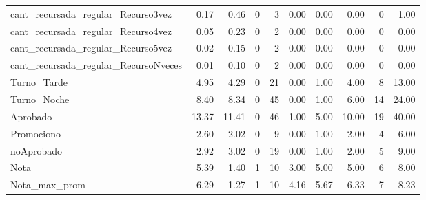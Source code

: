 \begin{table}[!h]
{\begin{tabular}[t]{lrrrrrrrrr}
			\rowcolor{gray!6}  cant\_recursada\_regular\_Recurso3vez & 0.17 & 0.46 & 0 & 3 & 0.00 & 0.00 & 0.00 & 0 & 1.00\\
			cant\_recursada\_regular\_Recurso4vez & 0.05 & 0.23 & 0 & 2 & 0.00 & 0.00 & 0.00 & 0 & 0.00\\
			\rowcolor{gray!6}  cant\_recursada\_regular\_Recurso5vez & 0.02 & 0.15 & 0 & 2 & 0.00 & 0.00 & 0.00 & 0 & 0.00\\
			\addlinespace
			cant\_recursada\_regular\_RecursoNveces & 0.01 & 0.10 & 0 & 2 & 0.00 & 0.00 & 0.00 & 0 & 0.00\\
			\rowcolor{gray!6}  Turno\_Tarde & 4.95 & 4.29 & 0 & 21 & 0.00 & 1.00 & 4.00 & 8 & 13.00\\
			Turno\_Noche & 8.40 & 8.34 & 0 & 45 & 0.00 & 1.00 & 6.00 & 14 & 24.00\\
			\rowcolor{gray!6}  Aprobado & 13.37 & 11.41 & 0 & 46 & 1.00 & 5.00 & 10.00 & 19 & 40.00\\
			Promociono & 2.60 & 2.02 & 0 & 9 & 0.00 & 1.00 & 2.00 & 4 & 6.00\\
			\addlinespace
			\rowcolor{gray!6}  noAprobado & 2.92 & 3.02 & 0 & 19 & 0.00 & 1.00 & 2.00 & 5 & 9.00\\
			Nota & 5.39 & 1.40 & 1 & 10 & 3.00 & 5.00 & 5.00 & 6 & 8.00\\
			\rowcolor{gray!6}  Nota\_max\_prom & 6.29 & 1.27 & 1 & 10 & 4.16 & 5.67 & 6.33 & 7 & 8.23\\
			\bottomrule
	\end{tabular}}
\end{table}